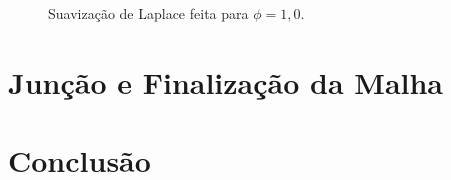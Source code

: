 \begin{figure}[!ht]
{	}
	\qquad	
	\caption{Suavização de Laplace feita para $\phi=1,0$.}
	\label{fig:laplace}
\end{figure}


\section{Junção e Finalização da Malha}


\section{Conclusão}

